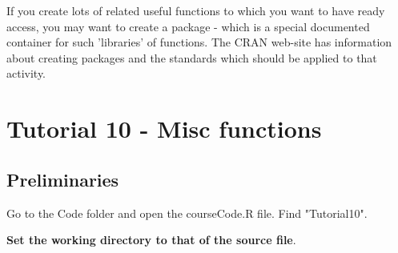 \documentclass[titlepage]{book}\usepackage{knitr}
\begin{document}
\begin{knitrout}
\color{fgcolor}\begin{kframe}
\begin{alltt}
\hlstd{()}
\hlstd{(}\hlstd{)}
\hlstd{(}\hlstd{)}
\end{alltt}
\end{kframe}
\end{knitrout}

If you create lots of related useful functions to which you want to have ready access, you may want to create a package - which is a special documented container for such 'libraries' of functions. The CRAN web-site has information about creating packages and the standards which should be applied to that activity.








\chapter{Tutorial 10 - Misc functions}\label{T10}

\author{Brian Williams $<$\href{mailto:bjw649@gmail.com}%
{bjw649@gmail.com}$>$}

\section{Preliminaries}

Go to the Code folder and open the courseCode.R file.  Find "Tutorial10".

\textbf{Set the working directory to that of the source file}.











\end{document}
